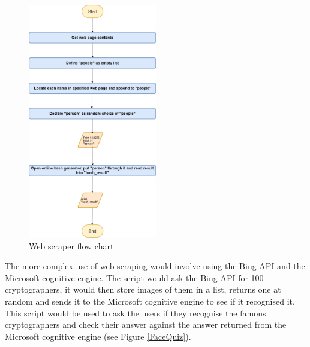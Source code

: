 \documentclass[12pt,a4paper]{article}
\begin{document}
\begin{figure}[h]
    \centering
    \includegraphics[width=0.5\textwidth]{Figs/Web_scraper.png} 
    \caption{Web scraper flow chart} 
    \label{WebScraper}
\end{figure}   


The more complex use of web scraping would involve using the Bing API and the Microsoft cognitive engine. The script would ask the Bing API for 100 cryptographers, it would then store images of them in a list, returns one at random and sends it to the Microsoft cognitive engine to see if it recognised it. This script would be used to ask the users if they recognise the famous cryptographers and check their answer against the answer returned from the Microsoft cognitive engine (see Figure \ref{FaceQuiz}).   

\clearpage{}
\end{document}

